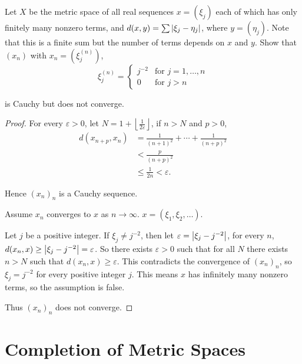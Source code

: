 \begin{exercise}\label{chapter1:section5:exercise15}
    Let $X$ be the metric space of all real sequences $x = (\xi_{j})$ each of which has only finitely many nonzero terms, and $d(x, y) = \sum\left\vert{\xi_{j} - \eta_{j}}\right\vert$, where $y = (\eta_{j})$. Note that this is a finite sum but the number of terms depends on $x$ and $y$. Show that $(x_{n})$ with $x_{n} = (\xi_{j}^{(n)})$,
    \[
        \xi_{j}^{(n)} = \begin{cases}
            j^{-2} & \text{for $j = 1, \ldots, n$} \\
            0      & \text{for $j > n$}
        \end{cases}
    \]

    is Cauchy but does not converge.
\end{exercise}

\begin{proof}
    For every $\varepsilon > 0$, let $N = 1 + \left\lfloor\frac{1}{2\varepsilon}\right\rfloor$, if $n > N$ and $p > 0$,
    \begin{align*}
        d(x_{n+p}, x_{n}) & = \frac{1}{{(n+1)}^{2}} + \cdots + \frac{1}{{(n+p)}^{2}} \\
                          & < \frac{p}{{(n+p)}^{2}}                                  \\
                          & \leq \frac{1}{2n} < \varepsilon.
    \end{align*}

    Hence ${(x_{n})}_{n}$ is a Cauchy sequence.

    Assume $x_{n}$ converges to $x$ as $n\to\infty$. $x = (\xi_{1}, \xi_{2}, \ldots)$.

    Let $j$ be a positive integer. If $\xi_{j} \ne j^{-2}$, then let $\varepsilon = \left\vert{\xi_{j} - j^{-2}}\right\vert$, for every $n$, $d(x_{n}, x)\geq \left\vert{\xi_{j} - j^{-2}}\right\vert = \varepsilon$. So there exists $\varepsilon > 0$ such that for all $N$ there exists $n > N$ such that $d(x_{n}, x)\geq \varepsilon$. This contradicts the convergence of ${(x_{n})}_{n}$, so $\xi_{j} = j^{-2}$ for every positive integer $j$. This means $x$ has infinitely many nonzero terms, so the assumption is false.

    Thus ${(x_{n})}_{n}$ does not converge.
\end{proof}

\section{Completion of Metric Spaces}

